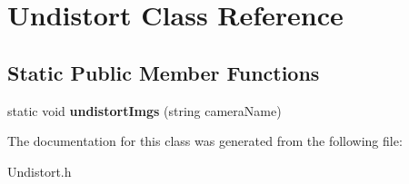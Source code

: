 \hypertarget{classUndistort}{}\section{Undistort Class Reference}
\label{classUndistort}
\subsection*{Static Public Member Functions}
\begin{DoxyCompactItemize}
\item 
\mbox{\label{classUndistort_a1082f78a003fca5fca34a8181796561f}} 
static void {\bfseries undistort\+Imgs} (string camera\+Name)
\end{DoxyCompactItemize}


The documentation for this class was generated from the following file\+:\begin{DoxyCompactItemize}
\item 
Undistort.\+h\end{DoxyCompactItemize}
